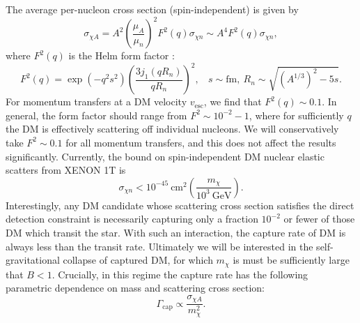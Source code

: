 \documentclass[preprintnumbers,amsmath,amssymb,prd,superscriptaddress]{revtex4}
\newcommand{\GeV}{\text{GeV}}
\def\r{\right)}
\def\l{\left(}
\begin{document}
The average per-nucleon cross section (spin-independent) is given by
\begin{equation}
\sigma_{\chi A} = A^2 \l \frac{\mu_{A}}{\mu_{n}}\r^2 F^2(q) \sigma_{\chi n} \sim A^4 F^2(q) \sigma_{\chi n},
\end{equation}
where $F^2(q)$ is the Helm form factor \cite{LUX thesis}:
\begin{equation}
F^2(q) = \exp (-q^2 s^2) \left(\frac{3 j_1(q R_n)}{q R_n}\right)^2, ~~~~ s \sim \text{fm}, ~ R_n \sim \sqrt{(A^{1/3})^2 - 5s}. 
\end{equation}
For momentum transfers at a DM velocity $v_\text{esc}$, we find that $F^2(q) \sim 0.1$. 
In general, the form factor should range from $F^2 \sim 10^{-2} - 1$, where for sufficiently $q$ the DM is effectively scattering off individual nucleons. 
We will conservatively take $F^2 \sim 0.1$ for all momentum transfers, and this does not affect the results significantly. 
Currently, the bound on spin-independent DM nuclear elastic scatters from XENON 1T \cite{Xenon} is
\begin{equation}
\label{eq:xenon}
\sigma_{\chi n} < 10^{-45} ~\text{cm}^2 \l \frac{m_\chi}{10^3 ~\GeV} \r.
\end{equation}
Interestingly, any DM candidate whose scattering cross section satisfies the direct detection constraint is necessarily capturing only a fraction $10^{-2}$ or fewer of those DM which transit the star.
With such an interaction, the capture rate of DM is always less than the transit rate. 
Ultimately we will be interested in the self-gravitational collapse of captured DM, for which $m_\chi$ is must be sufficiently large that $B < 1$.
Crucially, in this regime the capture rate has the following parametric dependence on mass and scattering cross section:
\begin{equation}
\Gamma_\text{cap} \propto \frac{\sigma_{\chi A}}{m_\chi^2}. 
\end{equation}
\end{document}
